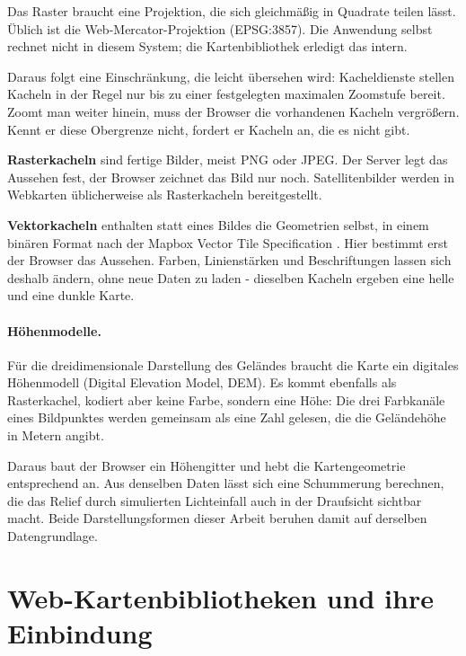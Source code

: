 \documentclass[12pt,a4paper]{report}
\begin{document}
Das Raster braucht eine Projektion, die sich gleichmäßig in Quadrate teilen lässt. Üblich
ist die Web-Mercator-Projektion (EPSG:3857). Die Anwendung selbst rechnet nicht in diesem
System; die Kartenbibliothek erledigt das intern.


Daraus folgt eine Einschränkung, die leicht übersehen wird:
Kacheldienste stellen Kacheln in der Regel nur bis zu
einer festgelegten maximalen Zoomstufe bereit.
Zoomt man weiter hinein, muss der Browser die
vorhandenen Kacheln vergrößern. Kennt er diese
Obergrenze nicht, fordert er Kacheln an, die es
nicht gibt.


\textbf{Rasterkacheln} sind fertige Bilder, meist PNG oder JPEG. Der Server legt das
Aussehen fest, der Browser zeichnet das Bild nur noch. Satellitenbilder werden in Webkarten üblicherweise als Rasterkacheln bereitgestellt.

\textbf{Vektorkacheln} enthalten statt eines Bildes die Geometrien selbst, in einem binären
Format nach der Mapbox Vector Tile Specification \cite{MVTSpec}. Hier bestimmt erst der
Browser das Aussehen. Farben, Linienstärken und Beschriftungen lassen sich deshalb ändern,
ohne neue Daten zu laden - dieselben Kacheln ergeben eine helle und eine dunkle Karte.

\paragraph{Höhenmodelle.}
\label{subsec:hoehenmodelle}

Für die dreidimensionale Darstellung des Geländes braucht die Karte ein digitales
Höhenmodell (Digital Elevation Model, DEM). Es kommt ebenfalls als Rasterkachel, kodiert
aber keine Farbe, sondern eine Höhe: Die drei Farbkanäle eines Bildpunktes werden gemeinsam
als eine Zahl gelesen, die die Geländehöhe in Metern angibt.

Daraus baut der Browser ein Höhengitter und hebt die Kartengeometrie entsprechend an. Aus
denselben Daten lässt sich eine Schummerung berechnen, die das Relief durch simulierten
Lichteinfall auch in der Draufsicht sichtbar macht. Beide Darstellungsformen dieser Arbeit
beruhen damit auf derselben Datengrundlage.

\section{Web-Kartenbibliotheken und ihre Einbindung}
\label{sec:bibliotheken}
\end{document}
